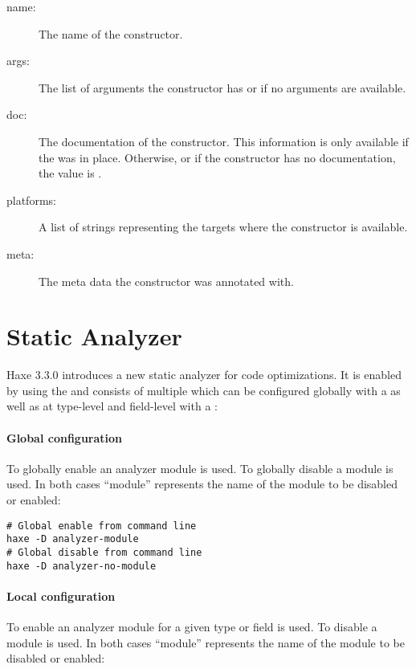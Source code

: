 \begin{description}
	\item[name:] The name of the constructor.
	\item[args:] The list of arguments the constructor has or  if no arguments are available.
	\item[doc:] The documentation of the constructor. This information is only available if the   was in place. Otherwise, or if the constructor has no documentation, the value is .
	\item[platforms:] A list of strings representing the targets where the constructor is available.
	\item[meta:] The meta data the constructor was annotated with.
\end{description}



\section{Static Analyzer}
\label{cr-static-analyzer}

Haxe 3.3.0 introduces a new static analyzer for code optimizations. It is enabled by using the   and consists of multiple  which can be configured globally with a  as well as at type-level and field-level with a :

\paragraph{Global configuration}
\label{cr-static-analyzer-global-configuration}

To globally enable an analyzer module  is used. To globally disable a module  is used. In both cases ``module'' represents the name of the module to be disabled or enabled:

\begin{lstlisting}
# Global enable from command line
haxe -D analyzer-module
# Global disable from command line
haxe -D analyzer-no-module
\end{lstlisting}

\paragraph{Local configuration}
\label{cr-static-analyzer-local-configuration}
To enable an analyzer module for a given type or field  is used. To disable a module  is used. In both cases ``module'' represents the name of the module to be disabled or enabled:

